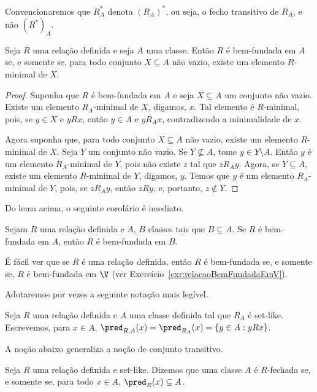 Convencionaremos que $R_A^*$ denota $(R_A)^*$, ou seja, o fecho transitivo de $R_A$, e não $(R^*)_A$.

\begin{lemma}[$\BST$]\label{lem:relacaoBemFundadaEmA}
    Seja $R$ uma relação definida e seja $A$ uma classe.
    Então $R$ é bem-fundada em $A$ se, e somente se, para todo conjunto $X\subseteq A$ não vazio, existe um elemento $R$-minimal de $X$.
\end{lemma}
\begin{proof}
    Suponha que $R$ é bem-fundada em $A$ e seja $X\subseteq A$ um conjunto não vazio.
    Existe um elemento $R_A$-minimal de $X$, digamos, $x$.
    Tal elemento é $R$-minimal, pois, se $y\in X$ e $y R x$, então $y\in A$ e $y R_A x$, contradizendo a minimalidade de $x$.

    Agora suponha que, para todo conjunto $X\subseteq A$ não vazio, existe um elemento $R$-minimal de $X$.
    Seja $Y$ um conjunto não vazio.
    Se $Y\not\subseteq A$, tome $y \in Y\setminus A$.
    Então $y$ é um elemento $R_A$-minimal de $Y$, pois não existe $z$ tal que $z R_A y$.
    Agora, se $Y\subseteq A$, existe um elemento $R$-minimal de $Y$, digamos, $y$.
    Temos que $y$ é um elemento $R_A$-minimal de $Y$, pois, se $z R_A y$, então $z R y$, e, portanto, $z\notin Y$.
\end{proof}

Do lema acima, o seguinte corolário é imediato.

\begin{corollary}[$\BST$]
    Sejam $R$ uma relação definida e $A$, $B$ classes tais que $B\subseteq A$.
    Se $R$ é bem-fundada em $A$, então $R$ é bem-fundada em $B$.
\end{corollary}

É fácil ver que se $R$ é uma relação definida, então $R$ é bem-fundada se, e somente se, $R$ é bem-fundada em $\V$ (ver Exercício~\ref{exr:relacaoBemFundadaEmV}).

Adotaremos por vezes a seguinte notação mais legível.

\begin{definition}\label{def:predRA}
    Seja $R$ uma relação definida e $A$ uma classe definida tal que $R_A$ é set-like.
    Escrevemos, para $x \in A$, $\pred_{R, A}(x)=\pred_{R_A}(x)=\{y\in A: y R x\}$.
\end{definition}

A noção abaixo generaliza a noção de conjunto transitivo.

\begin{definition}[$\BST$]
    Seja $R$ uma relação definida e set-like.
    Dizemos que uma classe $A$ é $R$-fechada se, e somente se, para todo $x\in A$, $\pred_{R}(x)\subseteq A$.
\end{definition}

